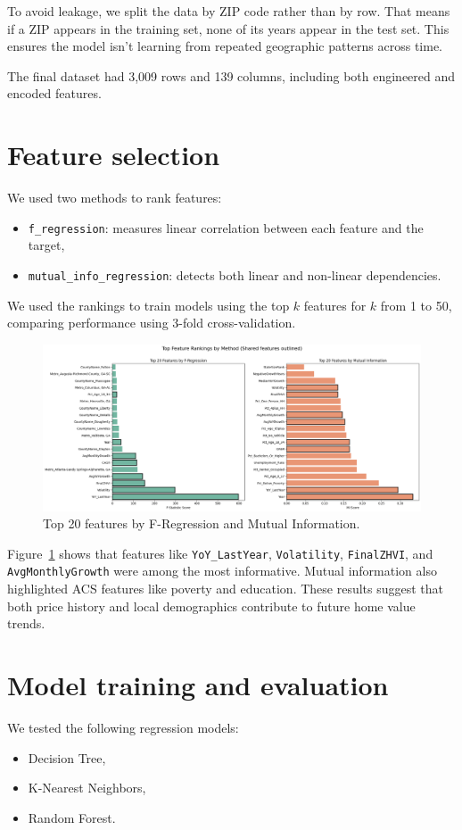 To avoid leakage, we split the data by ZIP code rather than by row. That means if a ZIP appears in the training set, none of its years appear in the test set. This ensures the model isn’t learning from repeated geographic patterns across time.

The final dataset had 3{,}009 rows and 139 columns, including both engineered and encoded features.

\section{Feature selection}
We used two methods to rank features:
\begin{itemize}
    \item \texttt{f\_regression}: measures linear correlation between each feature and the target,
    \item \texttt{mutual\_info\_regression}: detects both linear and non-linear dependencies.
\end{itemize}

We used the rankings to train models using the top $k$ features for $k$ from 1 to 50, comparing performance using 3-fold cross-validation.

\begin{figure}[!ht]
    \centering
    \includegraphics[width=\textwidth]{figures/topfeatures.png}
    \caption{Top 20 features by F-Regression and Mutual Information.}
    \label{fig:top_features}
\end{figure}
\FloatBarrier

Figure~\ref{fig:top_features} shows that features like \texttt{YoY\_LastYear}, \texttt{Volatility}, \texttt{FinalZHVI}, and \texttt{AvgMonthlyGrowth} were among the most informative. Mutual information also highlighted ACS features like poverty and education. These results suggest that both price history and local demographics contribute to future home value trends.

\section{Model training and evaluation}
We tested the following regression models:
\begin{itemize}
    \item Decision Tree,
    \item K-Nearest Neighbors,
    \item Random Forest.
\end{itemize}

